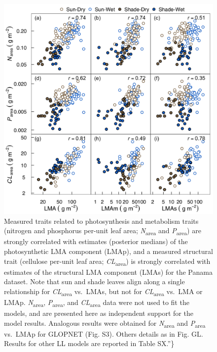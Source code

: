 \documentclass[
  12pt,
]{article}
\begin{document}
\begin{figure}
\hypertarget{fig:PA-NPC}{%
\centering
\includegraphics{../figs/PA_NPC.png}
\caption{Measured traits related to photosynthesis and metabolism traits (nitrogen and phosphorus per-unit leaf area; \emph{N}\textsubscript{area} and \emph{P}\textsubscript{area}) are strongly correlated with estimates (posterior medians) of the photosynthetic LMA component (LMAp), and a measured structural trait (cellulose per-unit leaf area; \emph{CL}\textsubscript{area}) is strongly correlated with estimates of the structural LMA component (LMAs) for the Panama dataset.
Note that sun and shade leaves align along a single relationship for \emph{CL}\textsubscript{area} vs.~LMAs, but not for \emph{CL}\textsubscript{area} vs.~LMA or LMAp. \emph{N}\textsubscript{area}, \emph{P}\textsubscript{area}, and \emph{CL}\textsubscript{area} data were not used to fit the models, and are presented here as independent support for the model results.
Analogous results were obtained for \emph{N}\textsubscript{area} and \emph{P}\textsubscript{area} vs.~LMAp for GLOPNET (Fig. S3).
Others details as in Fig. GL.
Results for other LL models are reported in Table SX.''\}}\label{fig:PA-NPC}
}
\end{figure}
\end{document}
